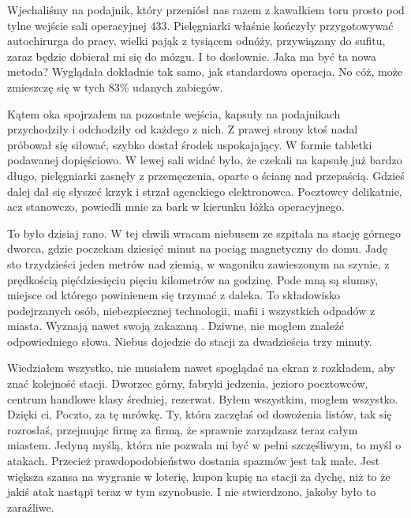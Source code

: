 Wjechaliśmy na podajnik, który przeniósł nas razem z kawałkiem toru prosto pod tylne wejście sali operacyjnej 433.
Pielęgniarki właśnie kończyły przygotowywać autochirurga do pracy, wielki pająk z tysiącem odnóży, przywiązany do sufitu, zaraz będzie dobierał mi się do mózgu. I to dosłownie.
Jaka ma być ta nowa metoda? Wyglądała dokładnie tak samo, jak standardowa operacja. No cóż, może zmieszczę się w tych 83\% udanych zabiegów.

Kątem oka spojrzałem na pozostałe wejścia, kapsuły na podajnikach przychodziły i odchodziły od każdego z nich.
Z prawej strony ktoś nadal próbował się siłować, szybko dostał środek uspokajający. W formie tabletki podawanej dopięściowo.
W lewej sali widać było, że czekali na kapsułę już bardzo długo, pielęgniarki zasnęły z przemęczenia, oparte o ścianę nad przepaścią.
Gdzieś dalej dał się słyszeć krzyk i strzał agenckiego elektronowca.
Pocztowcy delikatnie, acz stanowczo, powiedli mnie za bark w kierunku łóżka operacyjnego.

\divider{}

To było dzisiaj rano. W tej chwili wracam niebusem ze szpitala na stację górnego dworca, gdzie poczekam dziesięć minut na pociąg magnetyczny do domu.
Jadę sto trzydzieści jeden metrów nad ziemią, w wagoniku zawieszonym na szynie, z prędkością pięćdziesięciu pięciu kilometrów na godzinę. 
Pode mną są slumsy, miejsce od którego powinienem się trzymać z daleka. 
To składowisko podejrzanych osób, niebezpiecznej technologii, mafii i wszystkich odpadów z miasta.
Wyznają nawet swoją zakazaną \censor{}.
Dziwne, nie mogłem znaleźć odpowiedniego słowa.
Niebus dojedzie do stacji za dwadzieścia trzy minuty.

Wiedziałem wszystko, nie musiałem nawet spoglądać na ekran z rozkładem, aby znać kolejność stacji.
Dworzec górny, fabryki jedzenia, jezioro pocztowców, centrum handlowe klasy średniej, rezerwat.
Byłem wszystkim, mogłem wszystko. 
Dzięki ci, Poczto, za tę mrówkę. Ty, która zaczęłaś od dowożenia listów, tak się rozrosłaś, przejmując firmę za firmą, że sprawnie zarządzasz teraz całym miastem.
Jedyną myślą, która nie pozwala mi być w pełni szczęśliwym, to myśl o atakach. Przecież prawdopodobieństwo dostania spazmów jest tak małe.
Jest większa szansa na wygranie w loterię, kupon kupię na stacji za dychę, niż to że jakiś atak nastąpi teraz w tym szynobusie.
I nie stwierdzono, jakoby było to zaraźliwe.

